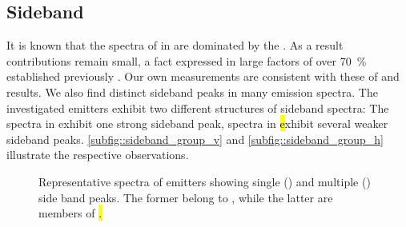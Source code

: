 	\subsection{Sideband} \label{subsubsec::sideband}



		It is known that the \pl spectra of \sivs in \nd are dominated by the \zpl. As a result \psb contributions remain small, a fact expressed in large \db factors of over \SI{70}{\percent} established previously \cite{Neu2011,Neu2011b}. Our own measurements are consistent with these of \emnarrow and \embroad results. We also find distinct sideband peaks in many \siv \pl emission spectra.
		The investigated emitters exhibit two different structures of sideband spectra: The spectra in \vl exhibit one strong sideband peak, spectra in \hl exhibit several weaker sideband peaks. \autoref{subfig::sideband_group_v} and \autoref{subfig::sideband_group_h} illustrate the respective observations.

		\begin{figure}[htp]
			\begin{subfigure}[t]{ 0.49\linewidth}
				\centering
				\caption{}
				\label{subfig::sideband_group_v}
			\end{subfigure}
			\hfill
			\begin{subfigure}[t]{ 0.49\linewidth}
				\centering
				\caption{}
				\label{subfig::sideband_group_h}
			\end{subfigure}
			\caption[Side band peaks for \sivs]{Representative spectra of emitters showing single () and multiple () side band peaks. The former belong to \vl, while the latter are members of \hl.}
			\label{fig::sideband_groups}
		\end{figure}

